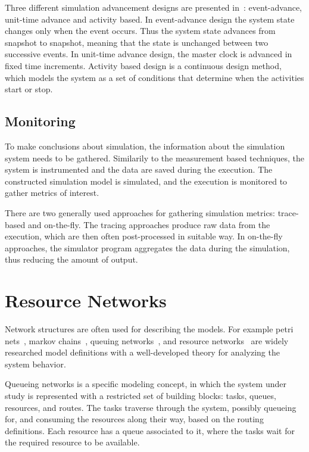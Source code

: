 Three different simulation advancement designs are presented in~\cite{peros:2009:simulation}: event-advance, unit-time advance and activity based. In event-advance design the system state changes only when the event occurs. Thus the system state advances from snapshot to snapshot, meaning that the state is unchanged between two successive events. In unit-time advance design, the master clock is advanced in fixed time increments. Activity based design is a continuous design method, which models the system as a set of conditions that determine when the activities start or stop.~\cite{peros:2009:simulation}

\subsection{Monitoring}
To make conclusions about simulation, the information about the simulation system needs to be gathered. Similarily to the measurement based techniques, the system is instrumented and the data are saved during the execution. The constructed simulation model is simulated, and the execution is monitored to gather metrics of interest.~\cite{jain:1991:AOCSPA, peros:2009:simulation}

There are two generally used approaches for gathering simulation metrics: trace-based and on-the-fly. The tracing approaches produce raw data from the execution, which are then often post-processed in suitable way. In on-the-fly approaches, the simulator program aggregates the data during the simulation, thus reducing the amount of output.~\cite{jain:1991:AOCSPA, peros:2009:simulation}

\section{Resource Networks}
Network structures are often used for describing the models. For example petri nets~\cite{Peterson:1981:Petri}, markov chains~\cite{Bolch:2006:Queueing}, queuing networks~\cite{Bolch:2006:Queueing}, and resource networks~\cite{Menasce:1994:CPP} are widely researched model definitions with a well-developed theory for analyzing the system behavior.

Queueing networks is a specific modeling concept, in which the system under study is represented with a restricted set of building blocks: tasks, queues, resources, and routes. The tasks traverse through the system, possibly queueing for, and consuming the resources along their way, based on the routing definitions. Each resource has a queue associated to it, where the tasks wait for the required resource to be available.~\cite{Bolch:2006:Queueing}

